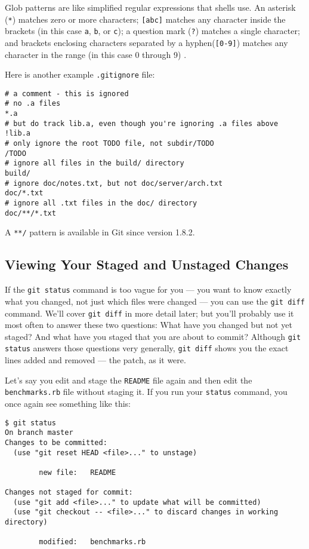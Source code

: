 \documentclass[a4paper]{book}
\begin{document}
Glob patterns are like simplified regular expressions that shells use. An asterisk (\texttt{*}) matches zero or more characters; \texttt{{[}abc{]}} matches any character inside the brackets (in this case \texttt{a}, \texttt{b}, or \texttt{c}); a question mark (\texttt{?}) matches a single character; and brackets enclosing characters separated by a hyphen(\texttt{{[}0-9{]}}) matches any character in the range (in this case 0 through 9) .

Here is another example \texttt{.gitignore} file:

\begin{shaded}\begin{verbatim}
# a comment - this is ignored
# no .a files
*.a
# but do track lib.a, even though you're ignoring .a files above
!lib.a
# only ignore the root TODO file, not subdir/TODO
/TODO
# ignore all files in the build/ directory
build/
# ignore doc/notes.txt, but not doc/server/arch.txt
doc/*.txt
# ignore all .txt files in the doc/ directory
doc/**/*.txt
\end{verbatim}\end{shaded}

A \texttt{**/} pattern is available in Git since version 1.8.2.

\subsection{Viewing Your Staged and Unstaged Changes}\label{viewing-your-staged-and-unstaged-changes}

If the \texttt{git status} command is too vague for you --- you want to know exactly what you changed, not just which files were changed --- you can use the \texttt{git diff} command. We'll cover \texttt{git diff} in more detail later; but you'll probably use it most often to answer these two questions: What have you changed but not yet staged? And what have you staged that you are about to commit? Although \texttt{git status} answers those questions very generally, \texttt{git diff} shows you the exact lines added and removed --- the patch, as it were.

Let's say you edit and stage the \texttt{README} file again and then edit the \texttt{benchmarks.rb} file without staging it. If you run your \texttt{status} command, you once again see something like this:

\begin{shaded}\begin{verbatim}
$ git status
On branch master
Changes to be committed:
  (use "git reset HEAD <file>..." to unstage)

        new file:   README

Changes not staged for commit:
  (use "git add <file>..." to update what will be committed)
  (use "git checkout -- <file>..." to discard changes in working directory)

        modified:   benchmarks.rb
\end{verbatim}\end{shaded}
\end{document}
